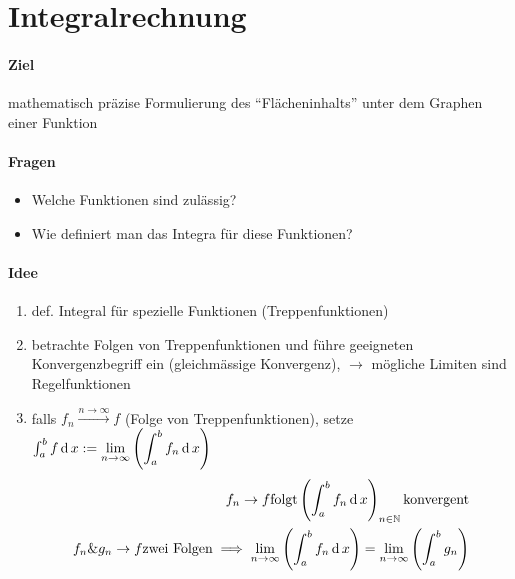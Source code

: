 \section{Integralrechnung}
\paragraph{Ziel} mathematisch präzise Formulierung des ``Flächeninhalts'' unter dem Graphen einer Funktion
\paragraph{Fragen}
\begin{itemize}
  \item Welche Funktionen sind zulässig?
  \item Wie definiert man das Integra für diese Funktionen?
\end{itemize}
\paragraph{Idee}
\begin{enumerate}
  \item def. Integral für spezielle Funktionen (Treppenfunktionen)
  \item betrachte Folgen von Treppenfunktionen und führe geeigneten Konvergenzbegriff ein (gleichmässige Konvergenz), $\to$ mögliche Limiten sind Regelfunktionen
  \item falls $f_n \xrightarrow{n\to\infty}f$ (Folge von Treppenfunktionen), setze $\int_a^b f \operatorname{d} x:= \displaystyle\lim_{n\rightarrow\infty}\left( \int^b_a f_n \operatorname{d} x \right)$
    \begin{align*}
      f_n\to f \text{folgt} \left( \int^b_a f_n \operatorname{d} x \right)_{n\in\mathbb{N}} \text{konvergent}\\
      f_n \& g_n \to f \text{zwei Folgen} \implies \displaystyle\lim_{n\rightarrow\infty} \left( \int^b_a f_n \operatorname{d} x \right)=\displaystyle\lim_{n\rightarrow\infty} \left( \int^b_a g_n \right)
    \end{align*}
\end{enumerate}

